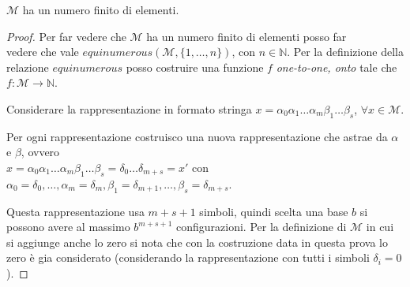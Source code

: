 \begin{exercise}[1.6]
$\mathcal{M}$ ha un numero finito di elementi.
\end{exercise}
\begin{proof}
Per far vedere che $\mathcal{M}$ ha un numero finito di elementi posso far \\
vedere che vale
$equinumerous(\mathcal{M}, \lbrace 1, \ldots, n\rbrace)$, con $n \in \mathbb{N}$.
Per la definizione della relazione $equinumerous$ posso costruire una funzione $f$
\emph{one-to-one, onto} tale che $f: \mathcal{M} \rightarrow \mathbb{N}$.

Considerare la rappresentazione in formato stringa 
$x = \alpha_{0}\alpha_{1}\ldots\alpha_{m}\beta_{1}\ldots\beta_{s}$, $\forall x \in \mathcal{M}$.

Per ogni rappresentazione costruisco una nuova rappresentazione che astrae da $\alpha$ e $\beta$, 
ovvero \\$x = \alpha_{0}\alpha_{1}\ldots\alpha_{m}\beta_{1}\ldots\beta_{s} =
\delta_{0} \ldots \delta_{m + s} = x'$
con $\alpha_{0} = \delta_{0}, \ldots, \alpha_{m} = \delta_{m}, \beta_{1} = \delta_{m + 1}, \ldots, 
\beta_{s} = \delta_{m + s}$.

Questa rappresentazione usa $m+s+1$ simboli, quindi scelta una base $b$ si
possono avere al massimo $b^{m+s+1}$ configurazioni. Per la definizione di
$\mathcal{M}$ in cui si aggiunge anche lo zero si nota che con la costruzione
data in questa prova lo zero \`e gia considerato (considerando la
rappresentazione con tutti i simboli $\delta_{i}=0$).

% 


\end{proof}
